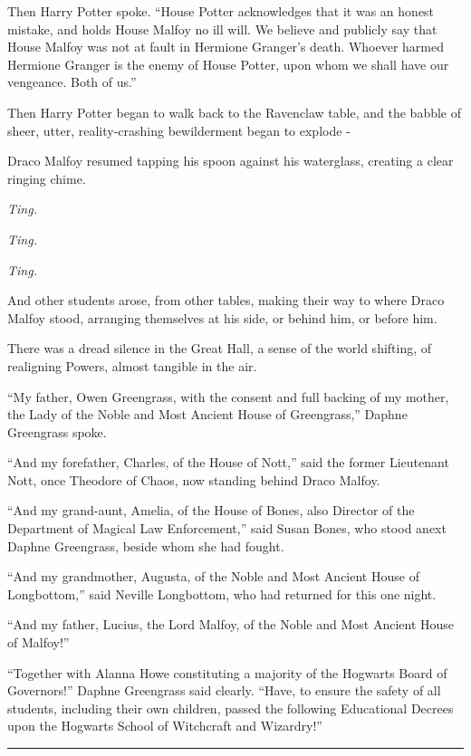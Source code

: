 Then Harry Potter spoke. ``House Potter acknowledges that it was an
honest mistake, and holds House Malfoy no ill will. We believe and
publicly say that House Malfoy was not at fault in Hermione Granger's
death. Whoever harmed Hermione Granger is the enemy of House Potter,
upon whom we shall have our vengeance. Both of us.''

Then Harry Potter began to walk back to the Ravenclaw table, and the
babble of sheer, utter, reality-crashing bewilderment began to explode -

Draco Malfoy resumed tapping his spoon against his waterglass, creating
a clear ringing chime.

\emph{Ting.}

\emph{Ting.}

\emph{Ting.}

And other students arose, from other tables, making their way to where
Draco Malfoy stood, arranging themselves at his side, or behind him, or
before him.

There was a dread silence in the Great Hall, a sense of the world
shifting, of realigning Powers, almost tangible in the air.

``My father, Owen Greengrass, with the consent and full backing of my
mother, the Lady of the Noble and Most Ancient House of Greengrass,''
Daphne Greengrass spoke.

``And my forefather, Charles, of the House of Nott,'' said the former
Lieutenant Nott, once Theodore of Chaos, now standing behind Draco
Malfoy.

``And my grand-aunt, Amelia, of the House of Bones, also Director of the
Department of Magical Law Enforcement,'' said Susan Bones, who stood
anext Daphne Greengrass, beside whom she had fought.

``And my grandmother, Augusta, of the Noble and Most Ancient House of
Longbottom,'' said Neville Longbottom, who had returned for this one
night.

``And my father, Lucius, the Lord Malfoy, of the Noble and Most Ancient
House of Malfoy!''

``Together with Alanna Howe constituting a majority of the Hogwarts
Board of Governors!'' Daphne Greengrass said clearly. ``Have, to ensure
the safety of all students, including their own children, passed the
following Educational Decrees upon the Hogwarts School of Witchcraft and
Wizardry!''

\begin{center}\rule{3in}{0.4pt}\end{center}

